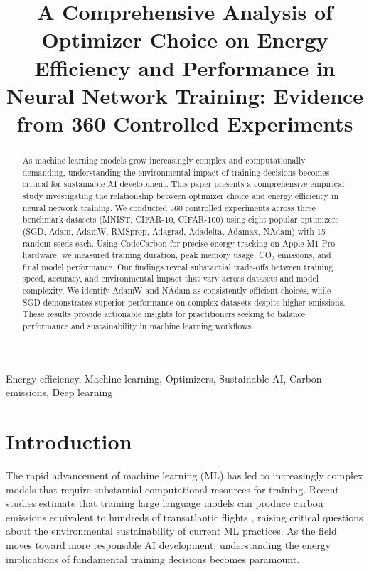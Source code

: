 \documentclass[conference]{IEEEtran}
\begin{document}
\title{A Comprehensive Analysis of Optimizer Choice on Energy Efficiency and Performance in Neural Network Training: Evidence from 360 Controlled Experiments}

\author{
}

\maketitle

\begin{abstract}
As machine learning models grow increasingly complex and computationally demanding, understanding the environmental impact of training decisions becomes critical for sustainable AI development. This paper presents a comprehensive empirical study investigating the relationship between optimizer choice and energy efficiency in neural network training. We conducted 360 controlled experiments across three benchmark datasets (MNIST, CIFAR-10, CIFAR-100) using eight popular optimizers (SGD, Adam, AdamW, RMSprop, Adagrad, Adadelta, Adamax, NAdam) with 15 random seeds each. Using CodeCarbon for precise energy tracking on Apple M1 Pro hardware, we measured training duration, peak memory usage, CO$_2$ emissions, and final model performance. Our findings reveal substantial trade-offs between training speed, accuracy, and environmental impact that vary across datasets and model complexity. We identify AdamW and NAdam as consistently efficient choices, while SGD demonstrates superior performance on complex datasets despite higher emissions. These results provide actionable insights for practitioners seeking to balance performance and sustainability in machine learning workflows.
\end{abstract}

\begin{IEEEkeywords}
Energy efficiency, Machine learning, Optimizers, Sustainable AI, Carbon emissions, Deep learning
\end{IEEEkeywords}

\section{Introduction}

The rapid advancement of machine learning (ML) has led to increasingly complex models that require substantial computational resources for training. Recent studies estimate that training large language models can produce carbon emissions equivalent to hundreds of transatlantic flights \cite{strubell2019energy}, raising critical questions about the environmental sustainability of current ML practices. As the field moves toward more responsible AI development, understanding the energy implications of fundamental training decisions becomes paramount.
\end{document}
